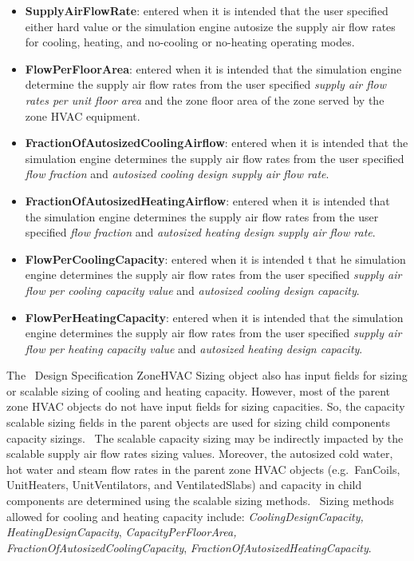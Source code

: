 \begin{itemize}
\item
  \textbf{SupplyAirFlowRate}: entered when it is intended that the user specified either hard value or the simulation engine autosize the supply air flow rates for cooling, heating, and no-cooling or no-heating operating modes.
\item
  \textbf{FlowPerFloorArea}: entered when it is intended that the simulation engine determine the supply air flow rates from the user specified \emph{supply air flow rates per unit floor area} and the zone floor area of the zone served by the zone HVAC equipment.
\item
  \textbf{FractionOfAutosizedCoolingAirflow}: entered when it is intended that the simulation engine determines the supply air flow rates from the user specified \emph{flow fraction} and \emph{autosized cooling design supply air flow rate}.
\item
  \textbf{FractionOfAutosizedHeatingAirflow}: entered when it is intended that the simulation engine determines the supply air flow rates from the user specified \emph{flow fraction} and \emph{autosized heating design supply air flow rate}.
\item
  \textbf{FlowPerCoolingCapacity}: entered when it is intended t that he simulation engine determines the supply air flow rates from the user specified \emph{supply air flow per cooling capacity value} and \emph{autosized cooling design capacity}.
\item
  \textbf{FlowPerHeatingCapacity}: entered when it is intended that the simulation engine determines the supply air flow rates from the user specified \emph{supply air flow per heating capacity value} and \emph{autosized heating design capacity}.
\end{itemize}

The~ Design Specification ZoneHVAC Sizing object also has input fields for sizing or scalable sizing of cooling and heating capacity. However, most of the parent zone HVAC objects do not have input fields for sizing capacities. So, the capacity scalable sizing fields in the parent objects are used for sizing child components capacity sizings.~ The scalable capacity sizing may be indirectly impacted by the scalable supply air flow rates sizing values. Moreover, the autosized cold water, hot water and steam flow rates in the parent zone HVAC objects (e.g.~FanCoils, UnitHeaters, UnitVentilators, and VentilatedSlabs) and capacity in child components are determined using the scalable sizing methods.~ Sizing methods allowed for cooling and heating capacity include: \emph{CoolingDesignCapacity, HeatingDesignCapacity}, \emph{CapacityPerFloorArea, FractionOfAutosizedCoolingCapacity}, \emph{FractionOfAutosizedHeatingCapacity}.


